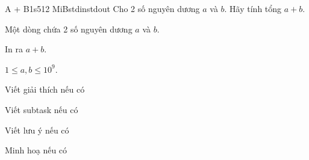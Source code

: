 \begin{statement}{A + B}{1s}{512 MiB}{stdin}{stdout}
Cho 2 số nguyên dương $a$ và $b$. Hãy tính tổng $a + b$.

\InputFile
Một dòng chứa 2 số nguyên dương $a$ và $b$.

\OutputFile
In ra $a + b$.

\Constraints
$1 \le a, b \le 10^9$.

\Example
\begin{example}
%
%
\end{example}

\begin{examplewide}
%
\end{examplewide}

\begin{examplewide}
%
\end{examplewide}

\begin{examplethree}
%
%
\end{examplethree}

\Explanations

Viết giải thích nếu có

\Scoring

Viết subtask nếu có

\Notes

Viết lưu ý nếu có

\Illustration

Minh hoạ nếu có
\end{statement}